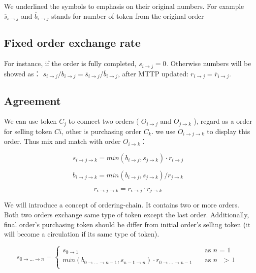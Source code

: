 \documentclass[UTF8,nofonts]{article}
\begin{document}
We underlined the symbols to emphasis on their original numbers. For example $\overline{s}_{i\rightarrow j}$ and $\overline{b}_{i\rightarrow j}$ stands for number of token from the original order

\subsection{Fixed order exchange rate\label{sec: consistrate}}

For instance,  if the order is fully completed, $s_{i\rightarrow j} = 0$. Otherwise numbers will be showed as：
$s_{i\rightarrow j} / b_{i\rightarrow j} = \overline{s}_{i\rightarrow j}/ \overline{b}_{i\rightarrow j}$,
after MTTP updated: $r_{i\rightarrow j} = \overline{r}_{i\rightarrow j}$.


\subsection{Agreement\label{sec: reducability}}


We can use token $C_j$ to connect two orders ( $O_{i\rightarrow j}$ and $O_{j\rightarrow k}$ ),  regard as a order for selling token $Ci$,  other is purchasing order $C_k$. we use $O_{i\rightarrow j\rightarrow k}$ to display this order. Thus mix and match with order $O_{i\rightarrow k}$：

\begin{equation}
s_{i\rightarrow j\rightarrow k}=min(b_{i\rightarrow j}, s_{j\rightarrow k}) \cdot r_{i\rightarrow j}
\end{equation}

\begin{equation}
b_{i\rightarrow j\rightarrow k}=min(b_{i\rightarrow j}, s_{j\rightarrow k}) / r_{j\rightarrow k}
\end{equation}

\begin{equation}
r_{i\rightarrow j\rightarrow k}= r_{i\rightarrow j}\cdot r_{j\rightarrow k}
\end{equation}


We will introduce a concept of ordering-chain. It contains two or more orders. Both two orders exchange same type of token except the last order. Additionally,  final order’s purchasing token should be differ from initial order’s selling token (it will become a circulation if its same type of token).

\[ s_{0\rightarrow ...\rightarrow n} =
 \begin{cases}
  s_{0\rightarrow 1}   & \quad \text{as } n \text{ = 1}\\
  min(b_{0\rightarrow ...\rightarrow n-1}, s_{n-1\rightarrow n}) \cdot r_{0\rightarrow ...\rightarrow n-1} & \quad \text{as\ } n \text{ $>$ 1}\\
 \end{cases}
\]
\end{document}
